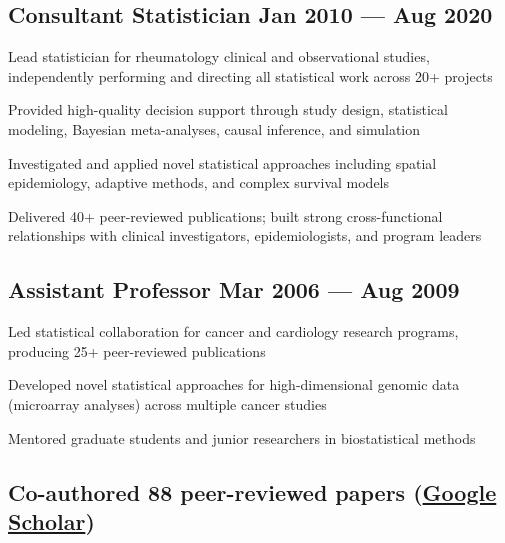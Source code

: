 \subsection{{Consultant Statistician \hfill Jan 2010 --- Aug 2020}}
\begin{zitemize}
    \item Lead statistician for rheumatology clinical and observational studies, independently performing and directing all statistical work across 20+ projects
    \item Provided high-quality decision support through study design, statistical modeling, Bayesian meta-analyses, causal inference, and simulation
    \item Investigated and applied novel statistical approaches including spatial epidemiology, adaptive methods, and complex survival models
    \item Delivered 40+ peer-reviewed publications; built strong cross-functional relationships with clinical investigators, epidemiologists, and program leaders
\end{zitemize}

\subsection{{Assistant Professor \hfill Mar 2006 --- Aug 2009}}
\begin{zitemize}
    \item Led statistical collaboration for cancer and cardiology research programs, producing 25+ peer-reviewed publications
    \item Developed novel statistical approaches for high-dimensional genomic data (microarray analyses) across multiple cancer studies
    \item Mentored graduate students and junior researchers in biostatistical methods
\end{zitemize}

\subsection{Co-authored 88 peer-reviewed papers (\href{https://scholar.google.com/citations?hl=en&user=EgaGUCwAAAAJ}{Google Scholar})}
